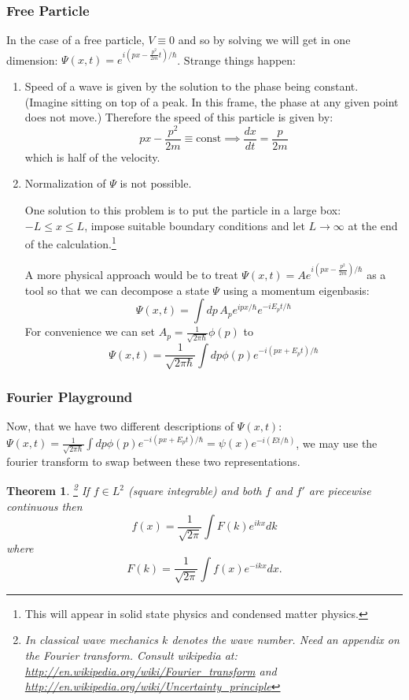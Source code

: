 \documentclass[11pt]{article}
\newcommand{\guillemot}[1]{\guillemotleft{#1}\guillemotright}
\newcommand{\FR}[2]{\frac{#1}{#2}}
\theoremstyle{plain}
\newtheorem{thm}{Theorem}[section]
\theoremstyle{definition}
\theoremstyle{remark}
\def\bE{\begin{enumerate}}
\def\eE{\end{enumerate}}
\def\ii{\item}
\begin{document}
\subsubsection{Free Particle}
In the case of a free particle, $V \equiv 0$ and so by solving we will
get in one dimension: $\Psi(x,t) = e^{i(px-\FR{p^2}{2m}t)/\hbar}$.
Strange things happen:
\bE
\ii Speed of a wave is given by the solution to the phase being constant.
(Imagine sitting on top of a peak. In this frame, the phase at any given point
does not move.) Therefore the speed of this particle is given by:
\[ px -\FR{p^2}{2m} \equiv \text{const} \implies \FR{dx}{dt} = \FR{p}{2m} \]
which is half of the \guillemot{expected} velocity.
\ii Normalization of $\Psi$ is not possible.

One solution to this problem is to put the particle in a large box:
$-L \le x \le L$, impose suitable boundary conditions and let 
$L \to \infty$ at the end of the calculation.\footnote{This will appear in
solid state physics and condensed matter physics.}

A more physical approach would be to treat $\Psi(x,t) = A e^{i(px-\FR{p^2}{2m})/\hbar}$
as a tool so that we can decompose a state $\Psi$ using a momentum eigenbasis:
\[\Psi(x,t) = \int dp\, A_p e^{ipx/\hbar} e^{-iE_p t/\hbar}\]
For convenience we can set $A_p = \FR{1}{\sqrt{2\pi\hbar}}\phi(p)$ to
\[\Psi(x,t) = \FR{1}{\sqrt{2\pi\hbar}}\int dp \phi(p) e^{-i(px+E_pt)/\hbar}\]
\eE

\subsubsection{Fourier Playground}

Now, that we have two different descriptions of $\Psi(x,t)$:
$\Psi(x,t) = \FR{1}{\sqrt{2\pi\hbar}}\int dp \phi(p) e^{-i(px+E_pt)/\hbar}
           = \psi(x)e^{-i(Et/\hbar)}$,
we may use the fourier transform to swap between these two representations.

\begin{thm}\label{FIT}
\footnote{In classical wave mechanics $k$ denotes the wave number.
    Need an appendix on the Fourier transform. Consult wikipedia at:
    \url{http://en.wikipedia.org/wiki/Fourier_transform}
and \url{http://en.wikipedia.org/wiki/Uncertainty_principle}}
If $f\in L^2$ (square integrable) and both $f$ and $f'$ are piecewise continuous
then \[ f(x) = \FR{1}{\sqrt{2\pi}}\int F(k) e^{ikx} dk \] where
\[F(k) = \FR{1}{\sqrt{2\pi}}\int f(x) e^{-ikx}dx.\]
\end{thm}
\end{document}
